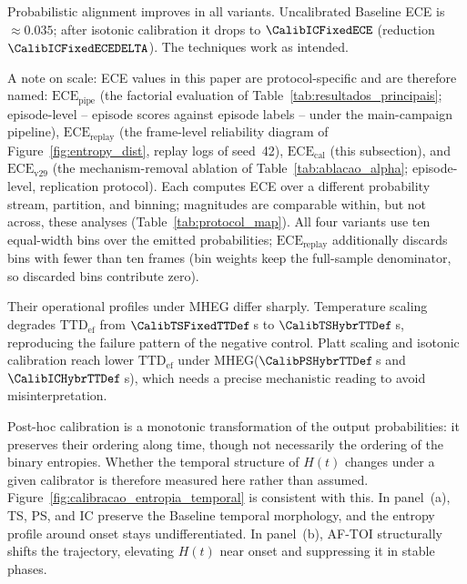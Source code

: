 \documentclass[a4paper,fleqn]{cas-dc}
\newcommand{\AFTOI}{\mbox{AF-TOI}\xspace}
\newcommand{\MHEG}{\mbox{MHEG}\xspace}
\begin{document}
Probabilistic alignment improves in all variants. Uncalibrated Baseline ECE is
$\approx 0.035$; after isotonic calibration it drops to $\CalibICFixedECE$
(reduction $\CalibICFixedECEDELTA$). The techniques work as intended.

{\color{\revcolor}A note on scale: ECE values in this paper are
protocol-specific and are therefore named: $\mathrm{ECE}_{\mathrm{pipe}}$
(the factorial evaluation of Table~\ref{tab:resultados_principais};
episode-level -- episode scores against episode labels -- under the
main-campaign pipeline),
$\mathrm{ECE}_{\mathrm{replay}}$ (the frame-level reliability diagram of
Figure~\ref{fig:entropy_dist}, replay logs of seed~42),
$\mathrm{ECE}_{\mathrm{cal}}$ (this subsection), and
$\mathrm{ECE}_{\mathrm{v29}}$ (the mechanism-removal ablation of
Table~\ref{tab:ablacao_alpha}; episode-level, replication protocol). Each computes ECE over
a different probability stream, partition, and binning; magnitudes are
comparable within, but not across, these analyses
(Table~\ref{tab:protocol_map}). All four variants use ten equal-width bins
over the emitted probabilities; $\mathrm{ECE}_{\mathrm{replay}}$ additionally
discards bins with fewer than ten frames (bin weights keep the full-sample
denominator, so discarded bins contribute zero).}

Their operational profiles under \MHEG differ sharply. Temperature scaling
degrades $\mathrm{TTD}_{\mathrm{ef}}$ from $\CalibTSFixedTTDef$\,s to
$\CalibTSHybrTTDef$\,s, reproducing the failure pattern of the negative control.
Platt scaling and isotonic calibration reach lower $\mathrm{TTD}_{\mathrm{ef}}$
under \MHEG ($\CalibPSHybrTTDef$\,s and $\CalibICHybrTTDef$\,s), which needs a
precise mechanistic reading to avoid misinterpretation.

{\color{\revcolor}Post-hoc calibration is a monotonic transformation of the
output probabilities: it preserves their ordering along time, though not
necessarily the ordering of the binary entropies. Whether the temporal
structure of $H(t)$ changes under a given calibrator is therefore measured
here rather than assumed.}
Figure~\ref{fig:calibracao_entropia_temporal} is consistent with this. In
panel~(a), TS, PS, and IC preserve the Baseline temporal morphology, and the
entropy profile around onset stays undifferentiated. In panel~(b), \AFTOI
structurally shifts the trajectory, elevating $H(t)$ near onset and
suppressing it in stable phases.
\end{document}
